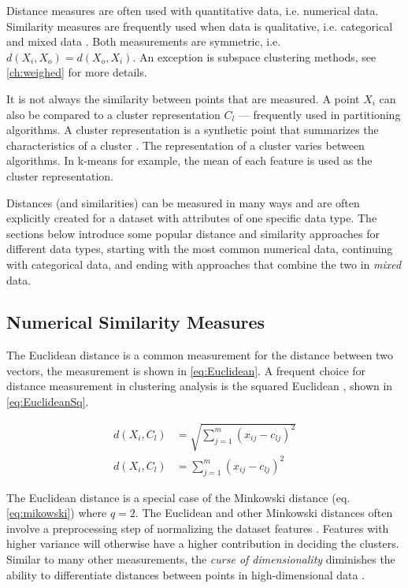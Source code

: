 \documentclass[../report.tex]{subfiles}
\begin{document}
\label{ch:sim}Distance measures are often used with quantitative data, i.e. numerical data. Similarity measures are frequently used when data is qualitative, i.e. categorical and mixed data \cite{Wunsch2005}. Both measurements are symmetric, i.e. $d(X_i, X_o) = d(X_o, X_i)$. An exception is subspace clustering methods, see \cref{ch:weighed} for more details.

It is not always the similarity between points that are measured. A point $X_i$ can also be compared to a cluster representation $C_l$ --- frequently used in partitioning algorithms. A cluster representation is a synthetic point that summarizes the characteristics of a cluster \cite{Guha2000, Kaufman1990, Ng1999}. The representation of a cluster varies between algorithms. In k-means for example, the mean of each feature is used as the cluster representation.

Distances (and similarities) can be measured in many ways and are often explicitly created for a dataset with attributes of one specific data type. The sections below introduce some popular distance and similarity approaches for different data types, starting with the most common numerical data, continuing with categorical data, and ending with approaches that combine the two in \textit{mixed} data.

\subsection{Numerical Similarity Measures}

The Euclidean distance is a common measurement for the distance between two vectors, the measurement is shown in \cref{eq:Euclidean}. A frequent choice for distance measurement in clustering analysis is the squared Euclidean \cite{Jain1999, Huang1998, huang2005automated}, shown in \cref{eq:EuclideanSq}.

\begin{align}
  \label{eq:Euclidean}
  d(X_i,C_l) &= \sqrt{\sum^{m}_{j=1}(x_{ij} - c_{lj})^2} \\
  \label{eq:EuclideanSq}
  d(X_i,C_l) &= \sum^{m}_{j=1}(x_{ij} - c_{lj})^2
\end{align}

The Euclidean distance is a special case of the Minkowski distance (eq. \ref{eq:mikowski}) where $q=2$. The Euclidean and other Minkowski distances often involve a preprocessing step of normalizing the dataset features \cite{Jain1999}. Features with higher variance will otherwise have a higher contribution in deciding the clusters. Similar to many other measurements, the \textit{curse of dimensionality} diminishes the ability to differentiate distances between points in high-dimensional data \cite{Parsons2004}.
\end{document}
